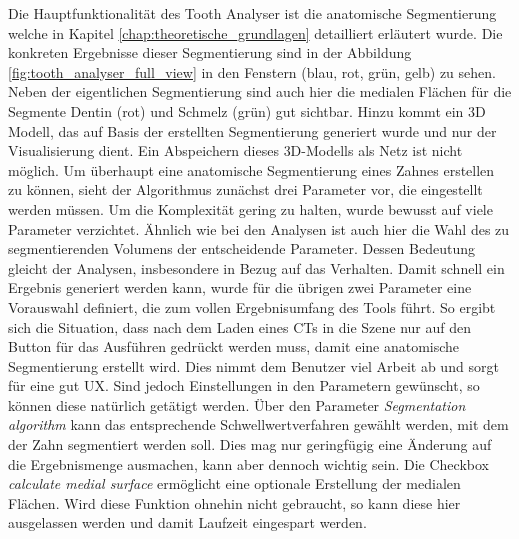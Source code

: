 Die Hauptfunktionalität des Tooth Analyser ist die anatomische Segmentierung welche
in Kapitel \ref{chap:theoretische_grundlagen} detailliert erläutert wurde. Die
konkreten Ergebnisse dieser Segmentierung sind in der Abbildung
\ref{fig:tooth_analyser_full_view} in den Fenstern (blau, rot, grün, gelb) zu sehen.
Neben der eigentlichen Segmentierung sind auch hier die medialen Flächen für die
Segmente Dentin (rot) und Schmelz (grün) gut sichtbar. Hinzu kommt ein \ac{3D}
Modell, das auf Basis der erstellten Segmentierung generiert wurde und nur der Visualisierung
dient. Ein Abspeichern dieses \ac{3D}-Modells als Netz ist nicht möglich. Um überhaupt
eine anatomische Segmentierung eines Zahnes erstellen zu können, sieht der
Algorithmus zunächst drei Parameter vor, die eingestellt werden müssen. Um die
Komplexität gering zu halten, wurde bewusst auf viele Parameter verzichtet.
Ähnlich wie bei den Analysen ist auch hier die Wahl des zu segmentierenden
Volumens der entscheidende Parameter. Dessen Bedeutung gleicht der Analysen,
insbesondere in Bezug auf das Verhalten. Damit schnell ein Ergebnis generiert werden
kann, wurde für die übrigen zwei Parameter eine Vorauswahl definiert, die zum vollen
Ergebnisumfang des Tools führt. So ergibt sich die Situation, dass nach dem Laden
eines \ac{CT}s in die Szene nur auf den Button für das Ausführen gedrückt werden
muss, damit eine anatomische Segmentierung erstellt wird. Dies nimmt dem Benutzer
viel Arbeit ab und sorgt für eine gut \ac{UX}. Sind jedoch Einstellungen in den Parametern
gewünscht, so können diese natürlich getätigt werden. Über den Parameter \textit{Segmentation
algorithm} kann das entsprechende Schwellwertverfahren gewählt werden, mit dem der
Zahn segmentiert werden soll. Dies mag nur geringfügig eine Änderung auf die
Ergebnismenge ausmachen, kann aber dennoch wichtig sein. Die Checkbox \textit{calculate
medial surface} ermöglicht eine optionale Erstellung der medialen Flächen. Wird
diese Funktion ohnehin nicht gebraucht, so kann diese hier ausgelassen werden und
damit Laufzeit eingespart werden.

